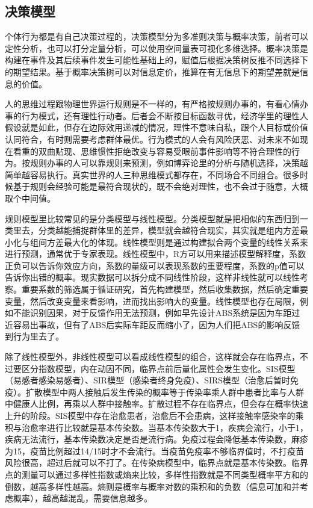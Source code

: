 \documentclass[]{tufte-book}
\begin{document}
\hypertarget{ux51b3ux7b56ux6a21ux578b}{%
\subsection{决策模型}\label{ux51b3ux7b56ux6a21ux578b}}

个体行为都是有自己决策过程的，决策模型分为多准则决策与概率决策，前者可以定性分析，也可以打分定量分析，可以使用空间量表可视化多维选择。概率决策是构建在事件及其后续事件发生可能性基础上的，赋值后根据决策树反推不同选择下的期望结果。基于概率决策树可以对信息定价，推算在有无信息下的期望差就是信息的价值。

人的思维过程跟物理世界运行规则是不一样的，有严格按规则办事的，有看心情办事的行为模式，还有理性行动者。后者会不断按目标函数寻优，经济学里的理性人假设就是如此，但存在边际效用递减的情况，理性不意味自私，跟个人目标或价值认同符合，有时则需要考虑群体最优。行为模式的人会有风险厌恶、对未来不如现在看重的双曲贴现、思维惯性拒绝改变与容易受眼前事件影响等不符合理性的行为。按规则办事的人可以靠规则来预测，例如博弈论里的分析与随机选择，决策越简单越容易执行。真实世界的人三种思维模式都存在，不同场合不同组合。很多时候基于规则会经验可能是最符合现状的，既不会绝对理性，也不会过于随意，大概取个中间值。

规则模型里比较常见的是分类模型与线性模型。分类模型就是把相似的东西归到一类里去，分类越能捕捉群体里的差异，模型就会越符合现实，其实就是组内方差最小化与组间方差最大化的体现。线性模型则是通过构建拟合两个变量的线性关系来进行预测，通常优于专家表现。线性模型中，R方可以用来描述模型解释度，系数正负可以告诉你效应方向，系数的量级可以表现系数的重要程度，系数的p值可以告诉你出错的概率。现实数据可以拆分成不同线性阶段，这样非线性就可以线性考察。重要系数的筛选属于循证研究，首先构建模型，然后收集数据，然后确定重要变量，然后改变变量来看影响，进而找出影响大的变量。线性模型也存在局限，例如不能识别因果，对于反馈作用无法预测，例如早先设计ABS系统是因为车距过近容易出事故，但有了ABS后实际车距反而缩小了，因为人们把ABS的影响反馈到行为里去了。

除了线性模型外，非线性模型可以看成线性模型的组合，这样就会存在临界点，不过要区分指数模型，内在动因不同，临界点前后量化属性会发生变化。SIS模型（易感者感染易感者）、SIR模型（感染者终身免疫）、SIRS模型（治愈后暂时免疫）。扩散模型中两人接触后发生传染的概率等于传染率乘人群中患者比率与人群中健康人比例，再乘以人群中接触率。扩散过程不存在临界点，但会存在概率快速上升的阶段。SIS模型中存在治愈患者，治愈后不会患病，这样接触率感染率的乘积与治愈率进行比较就是基本传染数。当基本传染数大于1，疾病会流行，小于1，疾病无法流行，基本传染数决定是否是流行病。免疫过程会降低基本传染数，麻疹为15，疫苗比例超过14/15时才不会流行。当疫苗免疫率不够临界值时，不打疫苗风险很高，超过后就可以不打了。在传染病模型中，临界点就是基本传染数。临界点的测量可以通过多样性指数或熵来比较，多样性指数就是不同类型概率平方和的倒数，越高多样性越高。熵则是概率与概率对数的乘积和的负数（信息可加和并考虑概率），越高越混乱，需要信息越多。
\end{document}
